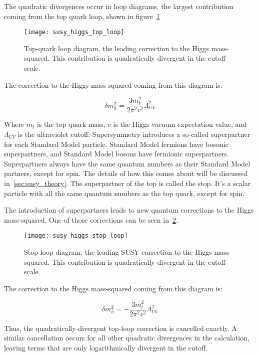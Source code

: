 The quadratic divergences occur in loop diagrams,
the largest contribution coming from the top quark loop, shown in figure~\ref{fig:susy_top_loop}

\begin{figure}[!ht]
    \centering
\texttt{[image: susy\_higgs\_top\_loop]}
\caption{Top-quark loop diagram, the leading correction to the Higgs mass-squared. This contribution is quadratically divergent in the cutoff scale.}
\label{fig:susy_top_loop}
\end{figure}

The correction to the Higgs mass-squared coming from this diagram is:

\begin{equation}\label{eq:higgs_top_correction}
    \delta m_h^2 = \frac{3m_t^2}{2\pi^2 v^2}\Lambda_{UV}^2
\end{equation}

Where $m_t$ is the top quark mass, $v$ is the Higgs vacuum expectation value, and $\Lambda_{UV}$ is the ultraviolet cutoff.
Supersymmetry introduces a so-called superpartner for each Standard Model particle.
Standard Model fermions have bosonic superpartners, and Standard Model bosons have fermionic superpartners.
Superpartners always have the same quantum numbers as their Standard Model partners, except for spin.
The details of how this comes about will be discussed in~\ref{sec:susy_theory}.
The superpartner of the top is called the stop.
It's a scalar particle with all the same quantum numbers as the top quark, except for spin.

The introduction of superpartners leads to new quantum corrections to the Higgs mass-squared.
One of those corrections can be seen in~\ref{fig:susy_stop_loop}.

\begin{figure}[!ht]
    \centering
\texttt{[image: susy\_higgs\_stop\_loop]}
\caption{Stop loop diagram, the leading SUSY correction to the Higgs mass-squared. This contribution is quadratically divergent in the cutoff scale.}
\label{fig:susy_stop_loop}
\end{figure}

The correction to the Higgs mass-squared coming from this diagram is:

\begin{equation}\label{eq:higgs_stop_correction}
    \delta m_h^2 = -\frac{3m_t^2}{2\pi^2 v^2}\Lambda_{UV}^2
\end{equation}

Thus, the quadratically-divergent top-loop correction is cancelled exactly.
A similar cancellation occurs for all other quadratic divergences in the calculation,
leaving terms that are only logarithmically divergent in the cutoff.

